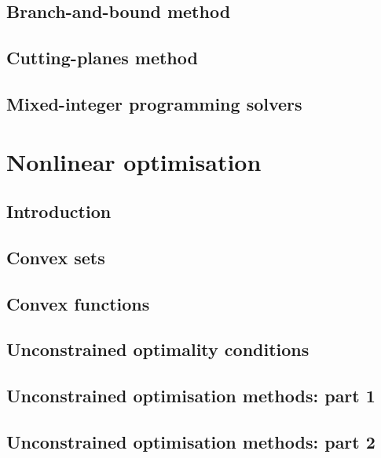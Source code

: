 \documentclass{bookest}
\begin{document}
	\chapter{Branch-and-bound method} \label{chapter_9}
	
	
	\chapter{Cutting-planes method} \label{chapter_10}
	
	
	\chapter{Mixed-integer programming solvers} \label{chapter_11}
	
		
	
	\part{Nonlinear optimisation} \label{part_2}
		
	\chapter{Introduction}
	
	
	\chapter{Convex sets}
	
	
	\chapter{Convex functions}
	
	
	\chapter{Unconstrained optimality conditions}
	
	
	\chapter{Unconstrained optimisation methods: part 1}
	
	
	\chapter{Unconstrained optimisation methods: part 2}
	
	
\end{document}
